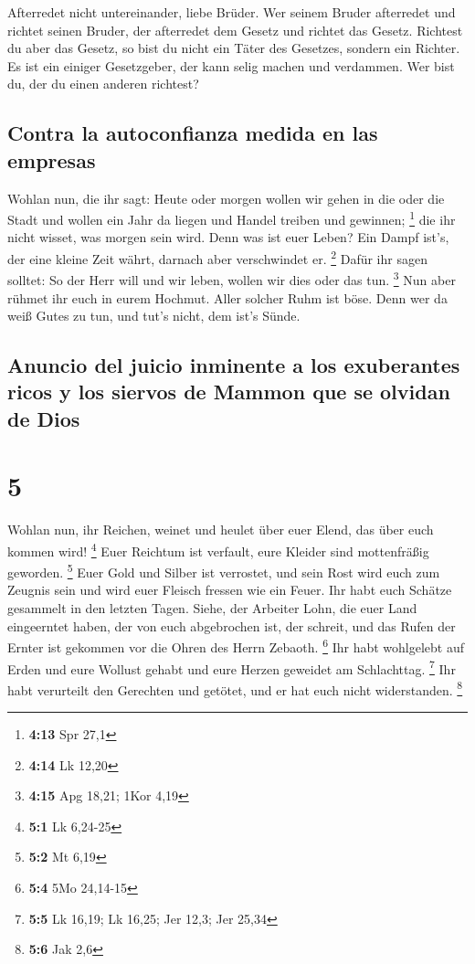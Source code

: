  Afterredet nicht untereinander, liebe Brüder. Wer seinem
Bruder afterredet und richtet seinen Bruder, der afterredet dem Gesetz
und richtet das Gesetz. Richtest du aber das Gesetz, so bist du nicht
ein Täter des Gesetzes, sondern ein Richter.  Es ist ein
einiger Gesetzgeber, der kann selig machen und verdammen. Wer bist du,
der du einen anderen richtest?

\hypertarget{contra-la-autoconfianza-medida-en-las-empresas}{%
\subsection{Contra la autoconfianza medida en las
empresas}\label{contra-la-autoconfianza-medida-en-las-empresas}}

 Wohlan nun, die ihr sagt: Heute oder morgen wollen wir
gehen in die oder die Stadt und wollen ein Jahr da liegen und Handel
treiben und gewinnen; \footnote{\textbf{4:13} Spr 27,1} 
die ihr nicht wisset, was morgen sein wird. Denn was ist euer Leben? Ein
Dampf ist's, der eine kleine Zeit währt, darnach aber verschwindet er.
\footnote{\textbf{4:14} Lk 12,20}  Dafür ihr sagen
solltet: So der Herr will und wir leben, wollen wir dies oder das tun.
\footnote{\textbf{4:15} Apg 18,21; 1Kor 4,19}  Nun aber
rühmet ihr euch in eurem Hochmut. Aller solcher Ruhm ist böse.
 Denn wer da weiß Gutes zu tun, und tut's nicht, dem
ist's Sünde.

\hypertarget{anuncio-del-juicio-inminente-a-los-exuberantes-ricos-y-los-siervos-de-mammon-que-se-olvidan-de-dios}{%
\subsection{Anuncio del juicio inminente a los exuberantes ricos y los
siervos de Mammon que se olvidan de
Dios}\label{anuncio-del-juicio-inminente-a-los-exuberantes-ricos-y-los-siervos-de-mammon-que-se-olvidan-de-dios}}

\hypertarget{section-4}{%
\section{5}\label{section-4}}

 Wohlan nun, ihr Reichen, weinet und heulet über euer
Elend, das über euch kommen wird! \footnote{\textbf{5:1} Lk 6,24-25}
 Euer Reichtum ist verfault, eure Kleider sind
mottenfräßig geworden. \footnote{\textbf{5:2} Mt 6,19} 
Euer Gold und Silber ist verrostet, und sein Rost wird euch zum Zeugnis
sein und wird euer Fleisch fressen wie ein Feuer. Ihr habt euch Schätze
gesammelt in den letzten Tagen.  Siehe, der Arbeiter Lohn,
die euer Land eingeerntet haben, der von euch abgebrochen ist, der
schreit, und das Rufen der Ernter ist gekommen vor die Ohren des Herrn
Zebaoth. \footnote{\textbf{5:4} 5Mo 24,14-15}  Ihr habt
wohlgelebt auf Erden und eure Wollust gehabt und eure Herzen geweidet am
Schlachttag. \footnote{\textbf{5:5} Lk 16,19; Lk 16,25; Jer 12,3; Jer
  25,34}  Ihr habt verurteilt den Gerechten und getötet,
und er hat euch nicht widerstanden. \footnote{\textbf{5:6} Jak 2,6}

